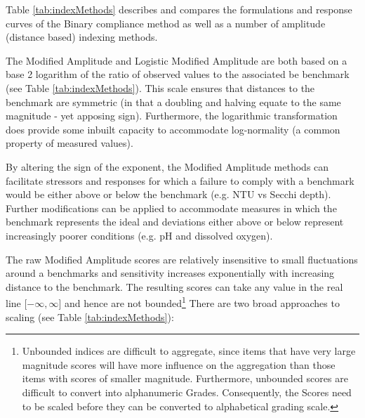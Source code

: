 Table \ref{tab:indexMethods} describes and compares the formulations and response curves of the
Binary compliance method as well as a number of amplitude (distance based) indexing methods.

The Modified Amplitude and Logistic Modified Amplitude are both based on a base 2 logarithm of the
ratio of observed values to the associated be benchmark (see Table \ref{tab:indexMethods}).  This
scale ensures that distances to the benchmark are symmetric (in that a doubling and halving equate
to the same magnitude - yet apposing sign).  Furthermore, the logarithmic transformation does
provide some inbuilt capacity to accommodate log-normality (a common property of measured values).

By altering the sign of the exponent, the Modified Amplitude methods can facilitate stressors and
responses for which a failure to comply with a benchmark would be either above or below the
benchmark (e.g. NTU vs Secchi depth).  Further modifications can be applied to accommodate measures
in which the benchmark represents the ideal and deviations either above or below represent
increasingly poorer conditions (e.g. pH and dissolved oxygen).
  
The raw Modified Amplitude scores are relatively insensitive to small fluctuations around a
benchmarks and sensitivity increases exponentially with increasing distance to the benchmark.  The
resulting scores can take any value in the real line [$-\infty, \infty$] and hence are not
bounded\footnote{Unbounded indices are difficult to aggregate, since items that have very large
magnitude scores will have more influence on the aggregation than those items with scores of smaller
magnitude.  Furthermore, unbounded scores are difficult to convert into alphanumeric Grades.
Consequently, the Scores need to be scaled before they can be converted to alphabetical grading
scale.}  There are two broad approaches to scaling (see Table \ref{tab:indexMethods}):

